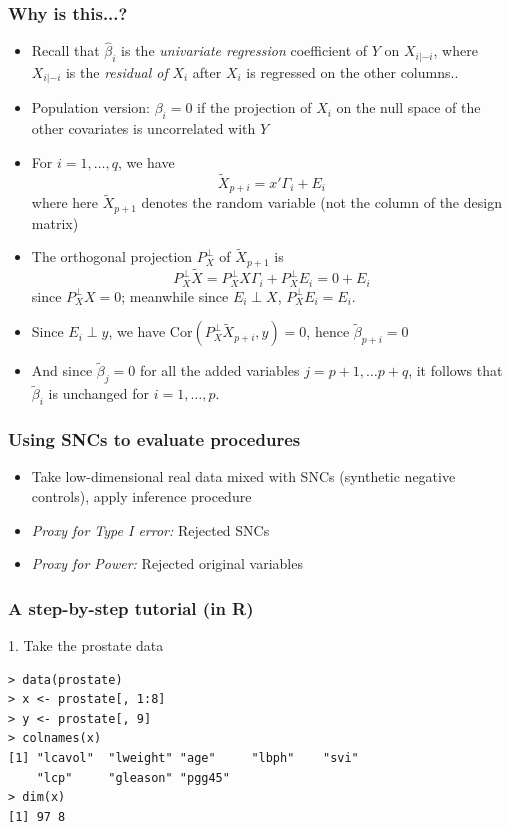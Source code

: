 \documentclass{beamer}
\begin{document}
\begin{frame}
\frametitle{Why is this...?}
\begin{itemize}
\item<1> Recall that $\hat{\beta}_i$ is the \emph{univariate regression} coefficient of $Y$
  on $X_{i|-i}$, where $X_{i|-i}$ is the \emph{residual of} $X_i$ after $X_i$ is regressed on the other columns..
\item<1-> Population version: $\beta_i = 0$ if the projection of $X_i$ on the null space of the other covariates is uncorrelated with $Y$
\item<2-3> For $i= 1, \hdots, q$, we have 
\[
\tilde{X}_{p+i} = x' \Gamma_i + E_i
\]
where here $\tilde{X}_{p+1}$ denotes the random variable (not the column of the design matrix)
\item<3-4> The orthogonal projection $P^\perp_X$ of $\tilde{X}_{p+1}$ is
\[
P^\perp_X \tilde{X} = P^\perp_X X \Gamma_i + P^\perp_X E_i = 0 + E_i
\]
since $P^\perp_X X = 0$; meanwhile since $E_i \perp X$, $P^\perp_X E_i = E_i$.
\item<4-5> Since $E_i \perp y$, we have $\text{Cor}(P^\perp_X \tilde{X}_{p+i} , y) = 0$, hence $\tilde{\beta}_{p+i} = 0$
\item<5-> And since $\tilde{\beta}_j = 0$ for all the added variables $j = p+1,\hdots p+q$, it follows that $\tilde{\beta}_i$ is unchanged for $i = 1,\hdots, p$.
\end{itemize}
\end{frame}

\begin{frame}
\frametitle{Using SNCs to evaluate procedures}
\begin{itemize}
\item Take low-dimensional real data mixed with SNCs (synthetic negative controls), apply inference procedure
\item \emph{Proxy for Type I error:} Rejected SNCs
\item \emph{Proxy for Power:} Rejected original variables
\end{itemize}
\end{frame}

\begin{frame}[fragile]
\frametitle{A step-by-step tutorial (in R)}
1. Take the prostate data
\begin{verbatim}
> data(prostate)
> x <- prostate[, 1:8]
> y <- prostate[, 9]
> colnames(x)
[1] "lcavol"  "lweight" "age"     "lbph"    "svi"
    "lcp"     "gleason" "pgg45"  
> dim(x)
[1] 97 8
\end{verbatim}
\end{frame}
\end{document}
